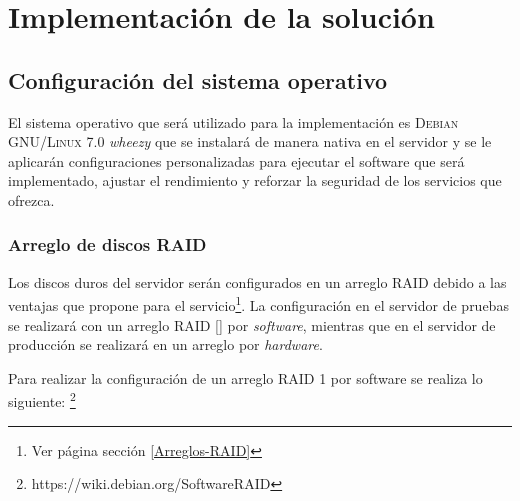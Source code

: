   \label{chap:cap3}

  \chapter {Implementaci\'{o}n de la soluci\'{o}n}

    \section {Configuraci\'{o}n del sistema operativo}

El sistema operativo que ser\'{a} utilizado para la implementaci\'{o}n es \textsc{Debian GNU/Linux} 7.0 \textit{\guillemotleft wheezy\guillemotright} que se instalar\'{a} de manera nativa en el servidor y se le aplicar\'{a}n configuraciones personalizadas para ejecutar el software que ser\'{a} implementado, ajustar el rendimiento y reforzar la seguridad de los servicios que ofrezca.

      \subsection {Arreglo de discos RAID}

Los discos duros del servidor ser\'{a}n configurados en un arreglo RAID debido a las ventajas que propone para el servicio\footnote{Ver p\'{a}gina \pageref{Arreglos-RAID} secci\'{o}n \ref{Arreglos-RAID}}. La configuraci\'{o}n en el servidor de pruebas se realizar\'{a} con un arreglo RAID [] por \textit{software}, mientras que en el servidor de producci\'{o}n se realizar\'{a} en un arreglo por \textit{hardware}.

Para realizar la configuraci\'{o}n de un arreglo RAID 1 por software se realiza lo siguiente: \footnote{https://wiki.debian.org/SoftwareRAID}

